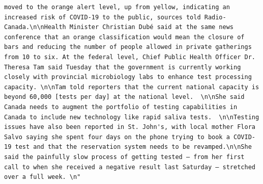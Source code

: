 \documentclass[]{article}
\begin{document}
\begin{verbatim}
moved to the orange alert level, up from yellow, indicating an increased risk of COVID-19 to the public, sources told Radio-Canada.\n\nHealth Minister Christian Dubé said at the same news conference that an orange classification would mean the closure of bars and reducing the number of people allowed in private gatherings from 10 to six. At the federal level, Chief Public Health Officer Dr. Theresa Tam said Tuesday that the government is currently working closely with provincial microbiology labs to enhance test processing capacity. \n\nTam told reporters that the current national capacity is beyond 60,000 [tests per day] at the national level.  \n\nShe said Canada needs to augment the portfolio of testing capabilities in Canada to include new technology like rapid saliva tests.  \n\nTesting issues have also been reported in St. John's, with local mother Flora Salvo saying she spent four days on the phone trying to book a COVID-19 test and that the reservation system needs to be revamped.\n\nShe said the painfully slow process of getting tested — from her first call to when she received a negative result last Saturday — stretched over a full week. \n"                                                                                                                                                                                                                                                                                                                                                                                                                                                                                                                                                                                                                                                                                                                                                                                                                                                                                                                                                                                                                                                                                                                                                                                                                                                                                                                                                                                                                                                                                                                                                                                                                                                                                                                                                                                                                                                                                                                                                                                                                                                                                                                                                                                                                                      
\end{verbatim}
\end{document}
